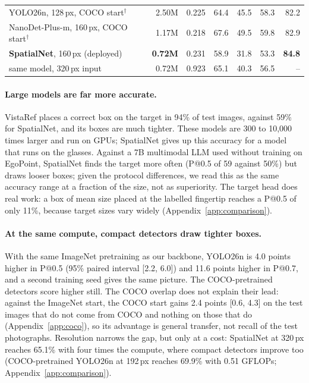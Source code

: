 \begin{table}[t]
\begin{tabular}{lrrrrrr}
    \quad YOLO26n, 128\,px, COCO start$^\dagger$ & 2.50M & 0.225 & 64.4 & 45.5 & 58.3 & 82.2 \\
    \quad NanoDet-Plus-m, 160\,px, COCO start$^\dagger$ & 1.17M & 0.218 & 67.6 & 49.5 & 59.8 & 82.9 \\
    \midrule
    \textbf{SpatialNet}, 160\,px (deployed) & \textbf{0.72M} & 0.231 & 58.9 & 31.8 & 53.3 & \textbf{84.8} \\
    \quad same model, 320\,px input & 0.72M & 0.923 & 65.1 & 40.3 & 56.5 & -- \\
    \bottomrule
  \end{tabular}
\end{table}

\paragraph{Large models are far more accurate.} VistaRef places a correct box on the target in 94\% of test images, against 59\% for SpatialNet, and its boxes are much tighter. These models are 300 to 10{,}000 times larger and run on GPUs; SpatialNet gives up this accuracy for a model that runs on the glasses. Against a 7B multimodal LLM used without training on EgoPoint, SpatialNet finds the target more often (P@0.5 of 59 against 50\%) but draws looser boxes; given the protocol differences, we read this as the same accuracy range at a fraction of the size, not as superiority. The target head does real work: a box of mean size placed at the labelled fingertip reaches a P@0.5 of only 11\%, because target sizes vary widely (Appendix~\ref{app:comparison}).

\paragraph{At the same compute, compact detectors draw tighter boxes.} With the same ImageNet pretraining as our backbone, YOLO26n is 4.0 points higher in P@0.5 (95\% paired interval [2.2, 6.0]) and 11.6 points higher in P@0.7, and a second training seed gives the same picture. The COCO-pretrained detectors score higher still. The COCO overlap does not explain their lead: against the ImageNet start, the COCO start gains 2.4 points [0.6, 4.3] on the test images that do not come from COCO and nothing on those that do (Appendix~\ref{app:coco}), so its advantage is general transfer, not recall of the test photographs. Resolution narrows the gap, but only at a cost: SpatialNet at 320\,px reaches 65.1\% with four times the compute, where compact detectors improve too (COCO-pretrained YOLO26n at 192\,px reaches 69.9\% with 0.51 GFLOPs; Appendix~\ref{app:comparison}).

